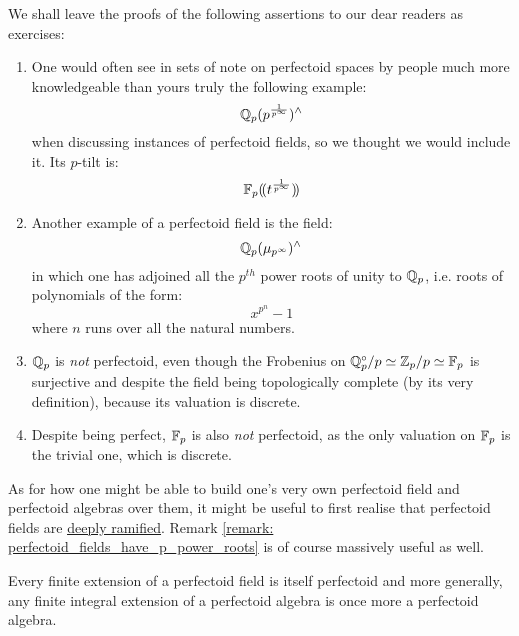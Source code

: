                     \begin{example} \label{example: perfectoid_fields}
                        We shall leave the proofs of the following assertions to our dear readers as exercises:
                            \begin{enumerate}
                                \item One would often see in sets of note on perfectoid spaces by people much more knowledgeable than yours truly the following example:
                                    $$\mathbb{Q}_p(p^{\frac{1}{p^{\infty}}})^{\wedge}$$
                                when discussing instances of perfectoid fields, so we thought we would include it. Its $p$-tilt is:
                                    $$\mathbb{F}_p(\!(t^{\frac{1}{p^{\infty}}})\!)$$
                                \item Another example of a perfectoid field is the field:
                                    $$\mathbb{Q}_p(\mu_{p^{\infty}})^{\wedge}$$
                                in which one has adjoined all the $p^{th}$ power roots of unity to $\mathbb{Q}_p$, i.e. roots of polynomials of the form:
                                    $$x^{p^n} - 1$$
                                where $n$ runs over all the natural numbers. 
                                \item $\mathbb{Q}_p$ is \textit{not} perfectoid, even though the Frobenius on $\mathbb{Q}_p^{\circ}/p \simeq \mathbb{Z}_p/p \simeq \mathbb{F}_p$ is surjective and despite the field being topologically complete (by its very definition), because its valuation is discrete.
                                \item Despite being perfect, $\mathbb{F}_p$ is also \textit{not} perfectoid, as the only valuation on $\mathbb{F}_p$ is the trivial one, which is discrete.
                            \end{enumerate}
                        As for how one might be able to build one's very own perfectoid field and perfectoid algebras over them, it might be useful to first realise that perfectoid fields are \href{https://blog.jpolak.org/?p=1726#:~:text=OF\%3D0.-,Theorem,perfectoid\%20field\%20is\%20deeply\%20ramified.&text=Since\%20perfectoid\%20fields\%20are\%20either,L\%2FOF\%3D0.}{\underline{deeply ramified}}. Remark \ref{remark: perfectoid_fields_have_p_power_roots} is of course massively useful as well.
                    \end{example}
                    \begin{remark} \label{remark: extensions_of_perfectoid_algebras}
                        Every finite extension of a perfectoid field is itself perfectoid and more generally, any finite integral extension of a perfectoid algebra is once more a perfectoid algebra.
                    \end{remark}
